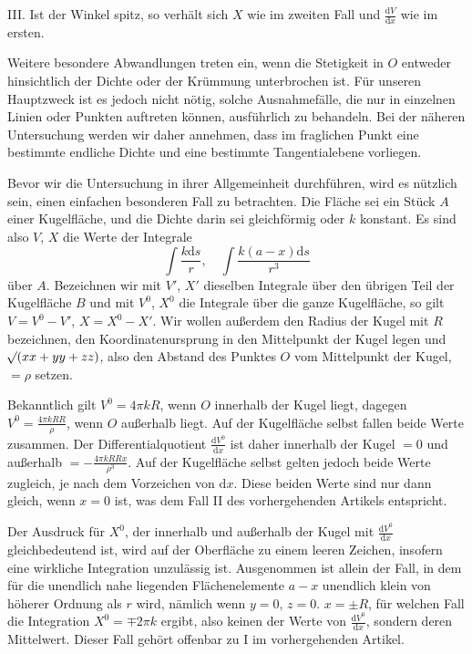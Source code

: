 III. Ist der Winkel spitz, so verhält sich $X$ wie im zweiten Fall und $\frac{\mathrm{d}V}{\mathrm{d}x}$ wie im ersten.

Weitere besondere Abwandlungen treten ein, wenn die Stetigkeit in $O$ entweder hinsichtlich der Dichte oder der Krümmung unterbrochen ist. Für unseren Hauptzweck ist es jedoch nicht nötig, solche Ausnahmefälle, die nur in einzelnen Linien oder Punkten auftreten können, ausführlich zu behandeln. Bei der näheren Untersuchung werden wir daher annehmen, dass im fraglichen Punkt eine bestimmte endliche Dichte und eine bestimmte Tangentialebene vorliegen.

Bevor wir die Untersuchung in ihrer Allgemeinheit durchführen, wird es nützlich sein, einen einfachen besonderen Fall zu betrachten. Die Fläche sei ein Stück $A$ einer Kugelfläche, und die Dichte darin sei gleichförmig oder $k$ konstant. Es sind also $V$, $X$ die Werte der Integrale
%
\[
\int\frac{k\mathrm{d}s}{r},\quad\int\frac{k(a-x)\mathrm{d}s}{r^3}
\]
über $A$. Bezeichnen wir mit $V'$, $X'$ dieselben Integrale über den übrigen Teil der Kugelfläche $B$ und mit $V^0$, $X^0$ die Integrale über die ganze Kugelfläche, so gilt $V=V^0-V'$, $X=X^0-X'$. Wir wollen außerdem den Radius der Kugel mit $R$ bezeichnen, den Koordinatenursprung in den Mittelpunkt der Kugel legen und $\mathord{{}^{}\!\surd}(xx+yy+zz)$, also den Abstand des Punktes $O$ vom Mittelpunkt der Kugel, $=\rho$ setzen.

Bekanntlich gilt $V^0=4\pi kR$, wenn $O$ innerhalb der Kugel liegt, dagegen $V^0=\frac{4\pi kRR}{\rho}$, wenn $O$ außerhalb liegt. Auf der Kugelfläche selbst fallen beide Werte zusammen. Der Differentialquotient $\frac{\mathrm{d}V^0}{\mathrm{d}x}$ ist daher innerhalb der Kugel $=0$ und außerhalb $=-\frac{4\pi kRRx}{\rho^3}$. Auf der Kugelfläche selbst gelten jedoch beide Werte zugleich, je nach dem Vorzeichen von $\mathrm{d}x$. Diese beiden Werte sind nur dann gleich, wenn $x=0$ ist, was dem Fall II des vorhergehenden Artikels entspricht.

Der Ausdruck für $X^0$, der innerhalb und außerhalb der Kugel mit $\frac{\mathrm{d}V^0}{\mathrm{d}x}$ gleichbedeutend ist, wird auf der Oberfläche zu einem leeren Zeichen, insofern eine wirkliche Integration unzulässig ist. Ausgenommen ist allein der Fall, in dem für die unendlich nahe liegenden Flächenelemente $a-x$ unendlich klein von höherer Ordnung als $r$ wird, nämlich wenn $y=0$, $z=0$. $x=\pm R$, für welchen Fall die Integration $X^0=\mp2\pi k$ ergibt, also keinen der Werte von $\frac{\mathrm{d}V^0}{\mathrm{d}x}$, sondern deren Mittelwert. Dieser Fall gehört offenbar zu I im vorhergehenden Artikel.

